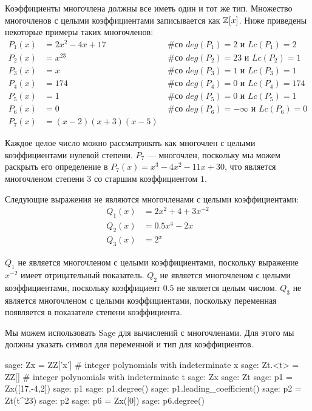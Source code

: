 \begin{example}
\label{example:integer_polynomials} Коэффициенты многочлена должны все иметь один и тот же тип. Множество многочленов с целыми коэффициентами записывается как $\mathbb{Z}[x]$. Ниже приведены некоторые примеры таких многочленов:
\begin{align*}
P_1(x) &= 2x^2 -4x +17 & \text{ \# со } deg(P_1)=2 \text{ и } Lc(P_1)=2\\
P_2(x) &= x^{23} & \text{ \# со } deg(P_2)=23 \text{ и } Lc(P_2)=1\\
P_3(x) &= x & \text{ \# со }  deg(P_3)=1 \text{ и } Lc(P_3)=1\\
P_4(x) &= 174 & \text{ \# со }  deg(P_4)=0 \text{ и } Lc(P_4)=174\\
P_5(x) &= 1 & \text{ \# со }  deg(P_5)=0 \text{ и } Lc(P_5)=1\\
P_6(x) &= 0 & \text{ \# со }  deg(P_6)=-\infty \text{ и } Lc(P_6)=0\\
P_7(x) &= (x-2)(x+3)(x-5)
\end{align*}

Каждое целое число можно рассматривать как многочлен с целыми коэффициентами нулевой степени. $P_7$ — многочлен, поскольку мы можем раскрыть его определение в $P_7(x)=x^3 - 4 x^2 - 11 x + 30$, что является многочленом степени $3$ со старшим коэффициентом $1$. 

Следующие выражения не являются многочленами с целыми коэффициентами:
\begin{align*}
Q_1(x) &= 2x^2 + 4 + 3x^{-2}\\
Q_2(x) &= 0.5x^4 -2x\\
Q_3(x) &=2^x
\end{align*}

$Q_1$ не является многочленом с целыми коэффициентами, поскольку выражение $x^{-2}$ имеет отрицательный показатель. $Q_2$ не является многочленом с целыми коэффициентами, поскольку коэффициент $0.5$ не является целым числом. $Q_3$ не является многочленом с целыми коэффициентами, поскольку переменная появляется в показателе степени коэффициента.

Мы можем использовать Sage для вычислений с многочленами. Для этого мы должны указать символ для переменной и тип для коэффициентов.  
\begin{sagecommandline}
sage: Zx = ZZ['x'] # integer polynomials with indeterminate x
sage: Zt.<t> = ZZ[] # integer polynomials with indeterminate t
sage: Zx
sage: Zt
sage: p1 = Zx([17,-4,2])
sage: p1
sage: p1.degree()
sage: p1.leading_coefficient()
sage: p2 = Zt(t^23)
sage: p2
sage: p6 = Zx([0])
sage: p6.degree()
\end{sagecommandline}
\end{example}
